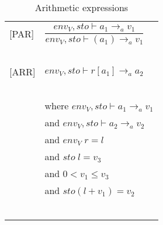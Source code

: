 \begin{longtable}{l l}
[PAR] & $\dfrac{env_V, sto \vdash a_1 \rightarrow_a v_1}{env_V, sto \vdash (a_1) \rightarrow_a v_1}$ \\
~ & ~ \\

[ARR] & $env_V, sto \vdash r[a_1] \rightarrow_a a_2$ \\
~ & ~ \\
~ & \indent\indent where $env_V, sto \vdash a_1 \rightarrow_a v_1$ \\
~ & \indent\indent and $env_V, sto \vdash a_2 \rightarrow_a v_2$ \\
~ & \indent\indent and $env_V \; r = l$ \\
~ & \indent\indent and $sto \; l = v_3$ \\
~ & \indent\indent and $0 < v_1 \leq v_3$ \\
~ & \indent\indent and $sto(l + v_1) = v_2$ \\
~ & ~ \\
\caption{Arithmetic expressions}
\end{longtable}

